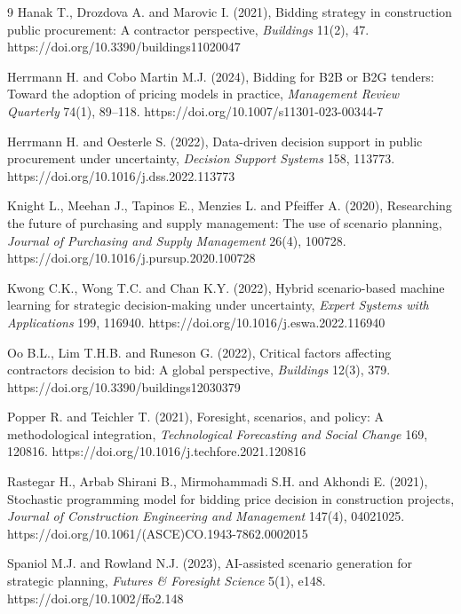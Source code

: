 \documentclass[twoside]{article}
\begin{document}
\begin{thebibliography}{9}
	Hanak T., Drozdova A. and Marovic I. (2021), Bidding strategy in construction public procurement: A contractor perspective, {\it Buildings} 11(2), 47. https://doi.org/10.3390/buildings11020047
	
	Herrmann H. and Cobo Martin M.J. (2024), Bidding for B2B or B2G tenders: Toward the adoption of pricing models in practice, {\it Management Review Quarterly} 74(1), 89--118. https://doi.org/10.1007/s11301-023-00344-7
	
	Herrmann H. and Oesterle S. (2022), Data-driven decision support in public procurement under uncertainty, {\it Decision Support Systems} 158, 113773. https://doi.org/10.1016/j.dss.2022.113773
	
	Knight L., Meehan J., Tapinos E., Menzies L. and Pfeiffer A. (2020), Researching the future of purchasing and supply management: The use of scenario planning, {\it Journal of Purchasing and Supply Management} 26(4), 100728. https://doi.org/10.1016/j.pursup.2020.100728
	
	Kwong C.K., Wong T.C. and Chan K.Y. (2022), Hybrid scenario-based machine learning for strategic decision-making under uncertainty, {\it Expert Systems with Applications} 199, 116940. https://doi.org/10.1016/j.eswa.2022.116940
	
	Oo B.L., Lim T.H.B. and Runeson G. (2022), Critical factors affecting contractors decision to bid: A global perspective, {\it Buildings} 12(3), 379. https://doi.org/10.3390/buildings12030379
	
	Popper R. and Teichler T. (2021), Foresight, scenarios, and policy: A methodological integration, {\it Technological Forecasting and Social Change} 169, 120816. https://doi.org/10.1016/j.techfore.2021.120816
	
	Rastegar H., Arbab Shirani B., Mirmohammadi S.H. and Akhondi E. (2021), Stochastic programming model for bidding price decision in construction projects, {\it Journal of Construction Engineering and Management} 147(4), 04021025. https://doi.org/10.1061/(ASCE)CO.1943-7862.0002015
	
	Spaniol M.J. and Rowland N.J. (2023), AI-assisted scenario generation for strategic planning, {\it Futures \& Foresight Science} 5(1), e148. https://doi.org/10.1002/ffo2.148
	

\end{thebibliography}
\end{document}
